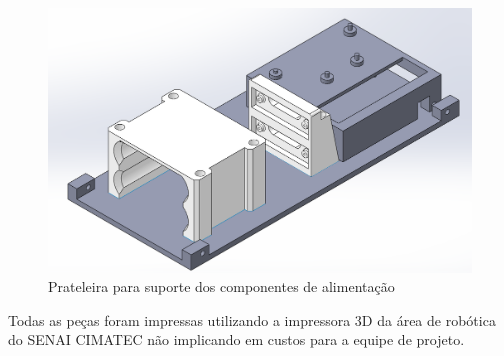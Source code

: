 \begin{figure}[h]
	\centering
	\includegraphics[width=14cm]{Figures/pecadebaixo.png}
	\caption{Prateleira para suporte dos componentes de alimentação} \label{pecaaliment}
\end{figure}

Todas as peças foram impressas utilizando a impressora 3D da área de robótica do SENAI CIMATEC não implicando em custos para a equipe de projeto.


 






